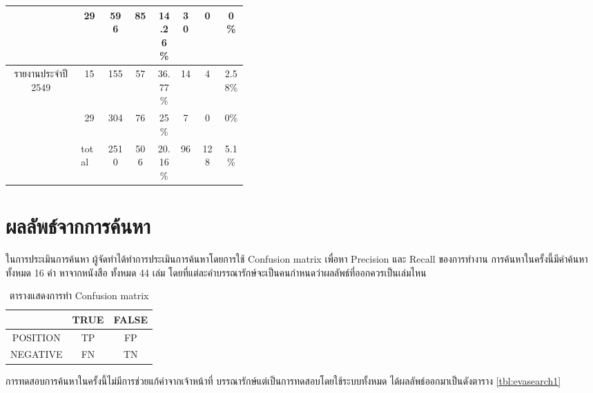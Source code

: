\begin{table}[H]
\begin{tabular}{|c|c|c|p{0.1\linewidth}|p{0.1\linewidth}|c|p{0.1\linewidth}|p{0.1\linewidth}|}
                                            & 29                         & \multicolumn{1}{c|}{596 }      & \multicolumn{1}{c|}{85 }         & \multicolumn{1}{c|}{14.26\%} & \multicolumn{1}{c|}{30}     & \multicolumn{1}{c|}{0  }             & \multicolumn{1}{c|}{0\%    } \\ \hline
        \multirow{2}{*}{รายงานประจำปี 2549} & 15                           & \multicolumn{1}{c|}{155 }      & \multicolumn{1}{c|}{57 }         & \multicolumn{1}{c|}{36.77\%} & \multicolumn{1}{c|}{14}     & \multicolumn{1}{c|}{4  }             & \multicolumn{1}{c|}{2.58\% } \\ \cline{2-8} 
                                            & 29                         & \multicolumn{1}{c|}{304 }      & \multicolumn{1}{c|}{76 }         & \multicolumn{1}{c|}{25\%   } & \multicolumn{1}{c|}{7 }     & \multicolumn{1}{c|}{0  }             & \multicolumn{1}{c|}{0\%    } \\ \hline
        \multicolumn{1}{|l|}{}              & \multicolumn{1}{l|}{total} & \multicolumn{1}{c|}{2510}      & \multicolumn{1}{c|}{506}         & \multicolumn{1}{c|}{20.16\%} & \multicolumn{1}{c|}{96}     & \multicolumn{1}{c|}{128}             & \multicolumn{1}{c|}{5.1\%  } \\ \hline
        \end{tabular}
        \end{table}

\section{ผลลัพธ์จากการค้นหา}
ในการประเมินการค้นหา ผู้จัดทำได้ทำการประเมินการค้นหาโดยการใช้ Confusion matrix 
เพื่อหา Precision และ Recall ของการทำงาน การค้นหาในครั้งนี้มีคำค้นหาทั้งหมด 
16 คำ หาจากหนังสือ ทั้งหมด 44 เล่ม โดยที่แต่ละคำบรรณารักษ์จะเป็นคนกำหนดว่าผลลัพธ์ที่ออกควรเป็นเล่มไหน 

\begin{table}[H]
    \caption{ตารางแสดงการทำ Confusion matrix}\label{tbl:evasearch}
    \begin{tabular}{|c|c|c|}
    \hline
             & TRUE & FALSE \\ \hline
    POSITION & TP   & FP   \\ \hline
    NEGATIVE & FN   & TN   \\ \hline
    \end{tabular}
    \end{table}

การทดสอบการค้นหาในครั้งนี้ไม่มีการช่วยแก้คำจากเจ้าหน้าที่
บรรณารักษ์แต่เป็นการทดสอบโดยใช้ระบบทั้งหมด 
ได้ผลลัพธ์ออกมาเป็นดังตาราง \ref{tbl:evasearch1}

